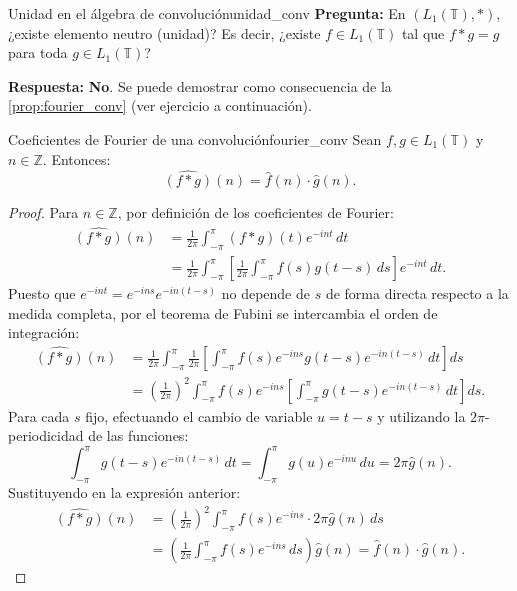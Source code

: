 \begin{observacion}{Unidad en el álgebra de convolución}{unidad_conv}
\textbf{Pregunta:} En $(L_1(\mathbb{T}), *)$, ¿existe elemento neutro (unidad)? Es decir, ¿existe $f \in L_1(\mathbb{T})$ tal que $f * g = g$ para toda $g \in L_1(\mathbb{T})$?

\textbf{Respuesta:} \textbf{No}. Se puede demostrar como consecuencia de la \cref{prop:fourier_conv} (ver ejercicio a continuación).
\end{observacion}

\begin{proposicion}{Coeficientes de Fourier de una convolución}{fourier_conv}
Sean $f, g \in L_1(\mathbb{T})$ y $n \in \mathbb{Z}$. Entonces:
\[
\widehat{(f * g)}(n) = \hat{f}(n) \cdot \hat{g}(n).
\]
\end{proposicion}

\begin{proof}
Para $n \in \mathbb{Z}$, por definición de los coeficientes de Fourier:
\begin{align*}
\widehat{(f * g)}(n) &= \frac{1}{2\pi} \int_{-\pi}^\pi (f * g)(t) e^{-int} \, dt \\
&= \frac{1}{2\pi} \int_{-\pi}^\pi \left[ \frac{1}{2\pi} \int_{-\pi}^\pi f(s) g(t - s) \, ds \right] e^{-int} \, dt.
\end{align*}
Puesto que $e^{-int} = e^{-ins} e^{-in(t - s)}$ no depende de $s$ de forma directa respecto a la medida completa, por el teorema de Fubini se intercambia el orden de integración:
\begin{align*}
\widehat{(f * g)}(n) &= \frac{1}{2\pi} \int_{-\pi}^\pi \frac{1}{2\pi} \left[ \int_{-\pi}^\pi f(s) e^{-ins} g(t - s) e^{-in(t - s)} \, dt \right] ds \\
&= \left(\frac{1}{2\pi}\right)^2 \int_{-\pi}^\pi f(s) e^{-ins} \left[ \int_{-\pi}^\pi g(t - s) e^{-in(t - s)} \, dt \right] ds.
\end{align*}
Para cada $s$ fijo, efectuando el cambio de variable $u = t - s$ y utilizando la $2\pi$-periodicidad de las funciones:
\[
\int_{-\pi}^\pi g(t - s) e^{-in(t - s)} \, dt = \int_{-\pi}^\pi g(u) e^{-inu} \, du = 2\pi \hat{g}(n).
\]
Sustituyendo en la expresión anterior:
\begin{align*}
\widehat{(f * g)}(n) &= \left(\frac{1}{2\pi}\right)^2 \int_{-\pi}^\pi f(s) e^{-ins} \cdot 2\pi \hat{g}(n) \, ds \\
&= \left( \frac{1}{2\pi} \int_{-\pi}^\pi f(s) e^{-ins} \, ds \right) \hat{g}(n) = \hat{f}(n) \cdot \hat{g}(n).
\end{align*}
\end{proof}

